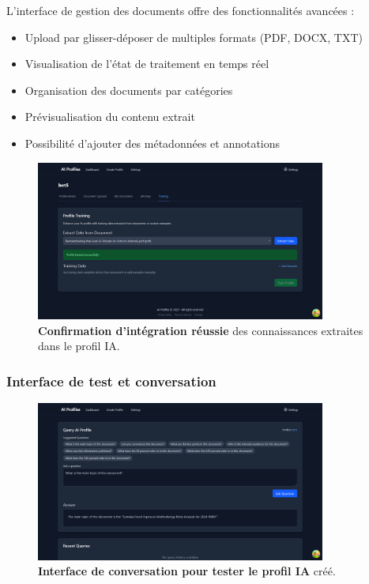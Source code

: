 L'interface de gestion des documents offre des fonctionnalités avancées :

\begin{itemize}
  \item Upload par glisser-déposer de multiples formats (PDF, DOCX, TXT)
  \item Visualisation de l'état de traitement en temps réel
  \item Organisation des documents par catégories
  \item Prévisualisation du contenu extrait
  \item Possibilité d'ajouter des métadonnées et annotations
\end{itemize}

\begin{figure}[H]
  \centering
  \includegraphics[width=0.85\textwidth,keepaspectratio]{pfe-pics/ai-profile-creation/succesful_knoladge_integration.png}
  \caption{\textbf{Confirmation d'intégration réussie} des connaissances extraites dans le profil IA.}
  \label{fig:knowledge_integration}
\end{figure}

\subsubsection{Interface de test et conversation}

\begin{figure}[H]
  \centering
  \includegraphics[width=0.85\textwidth,keepaspectratio]{pfe-pics/ai-profile-creation/chat_interface_to_test_the_profile.png}
  \caption{\textbf{Interface de conversation pour tester le profil IA} créé.}
  \label{fig:profile_testing}
\end{figure}

